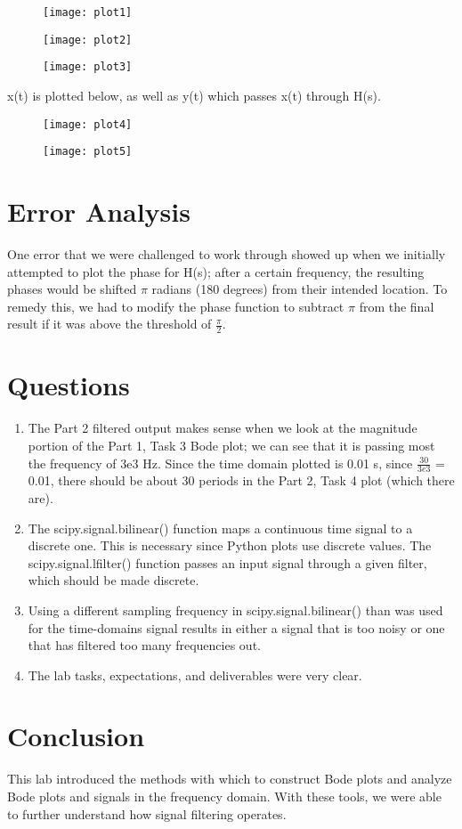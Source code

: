 \documentclass[11pt,a4,titlepage]{article}
\begin{document}
\begin{figure}[H]
	\centering
	\texttt{[image: plot1]}
\end{figure}

\begin{figure}[H]
	\centering
	\texttt{[image: plot2]}
\end{figure}

\begin{figure}[H]
	\centering
	\texttt{[image: plot3]}
\end{figure}

x(t) is plotted below, as well as y(t) which passes x(t) through H(s).

\begin{figure}[H]
	\centering
	\texttt{[image: plot4]}
\end{figure}

\begin{figure}[H]
	\centering
	\texttt{[image: plot5]}
\end{figure}

\section{Error Analysis}
One error that we were challenged to work through showed up when we initially attempted to plot the phase for H(s); after a certain frequency, the resulting phases would be shifted $\pi$ radians (180 degrees) from their intended location. To remedy this, we had to modify the phase function to subtract $\pi$ from the final result if it was above the threshold of $\frac{\pi}{2}$.

\section{Questions}
\begin{enumerate}
	\item The Part 2 filtered output makes sense when we look at the magnitude portion of the Part 1, Task 3 Bode plot; we can see that it is passing most the frequency of 3e3 Hz. Since the time domain plotted is 0.01 s, since $\frac{30}{3e3}$ = 0.01, there should be about 30 periods in the Part 2, Task 4 plot (which there are).
	\item The scipy.signal.bilinear() function maps a continuous time signal to a discrete one. This is necessary since Python plots use discrete values. The scipy.signal.lfilter() function passes an input signal through a given filter, which should be made discrete.
	\item Using a different sampling frequency in scipy.signal.bilinear() than was used for the time-domains signal results in either a signal that is too noisy or one that has filtered too many frequencies out.
	\item The lab tasks, expectations, and deliverables were very clear.
\end{enumerate}

\section{Conclusion}
This lab introduced the methods with which to construct Bode plots and analyze Bode plots and signals in the frequency domain. With these tools, we were able to further understand how signal filtering operates.
\end{document}
